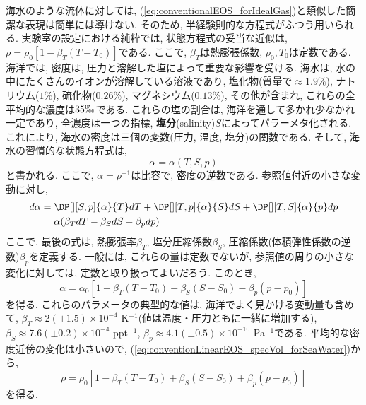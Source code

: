 海水のような流体に対しては, (\ref{eq:conventionalEOS_forIdealGas})と類似した簡潔な表現は簡単には導けない. 
そのため, 半経験則的な方程式がふつう用いられる. 
実験室の設定における純粋では, 状態方程式の妥当な近似は, $\rho = \rho_0 [1 - \beta_T(T-T_0)]$である. 
ここで, $\beta_T$は熱膨張係数, $\rho_0,T_0$は定数である. 
海洋では, 密度は, 圧力と溶解した塩によって重要な影響を受ける. 
海水は, 水の中にたくさんのイオンが溶解している溶液であり, 
塩化物(質量で$\approx 1.9\%$), ナトリウム($1\%$), 硫化物($0.26\%$), マグネシウム($0.13\%$), その他が含まれ,  
これらの全平均的な濃度は$35 \permil$である. 
これらの塩の割合は, 海洋を通して多かれ少なかれ一定であり, 
全濃度は一つの指標, \textbf{塩分}(salinity)$S$によってパラーメタ化される. 
これにより, 海水の密度は三個の変数(圧力, 温度, 塩分)の関数である. 
そして, 海水の習慣的な状態方程式は, 
\begin{equation}
 \alpha = \alpha (T,S,p)
\end{equation}
と書かれる. 
ここで, $\alpha=\rho^{-1}$は比容で, 密度の逆数である. 
参照値付近の小さな変動に対し, 
\begin{equation}
\begin{split}
 d\alpha &= \DP[][S,p]{\alpha}{T} dT + \DP[][T,p]{\alpha}{S} dS + \DP[][T,S]{\alpha}{p} dp \\
         &= \alpha (\beta_T dT - \beta_S dS - \beta_p dp)
\end{split}
\end{equation}
ここで, 最後の式は, 熱膨張率$\beta_T$, 塩分圧縮係数$\beta_S$,  
圧縮係数(体積弾性係数の逆数)$\beta_p$を定義する. 
一般には, これらの量は定数でないが, 参照値の周りの小さな変化に対しては, 
定数と取り扱ってよいだろう. 
このとき, 
\begin{equation}
 \alpha = \alpha_0 \left[ 1 + \beta_T(T-T_0) - \beta_S(S-S_0) - \beta_p (p-p_0) \right]
 \label{eq:conventionLinearEOS_specVol_forSeaWater}
\end{equation}
を得る. 
これらのパラメータの典型的な値は, 海洋でよく見かける変動量も含めて, 
$\beta_T \approx 2(\pm 1.5) \times 10^{-4} $ K$^{-1}$(値は温度・圧力ともに一緒に増加する), 
$\beta_S \approx 7.6(\pm 0.2) \times 10^{-4}$ ppt$^{-1}$, 
$\beta_p \approx 4.1(\pm 0.5) \times 10^{-10}$ Pa$^{-1}$である. 
平均的な密度近傍の変化は小さいので, (\ref{eq:conventionLinearEOS_specVol_forSeaWater})から, 
\begin{equation}
 \rho = \rho_0 \left[ 1 - \beta_T(T-T_0) + \beta_S(S-S_0) + \beta_p (p-p_0) \right]
 \label{eq:conventionLinearEOS_dens_forSeaWater}
\end{equation}
を得る. 

